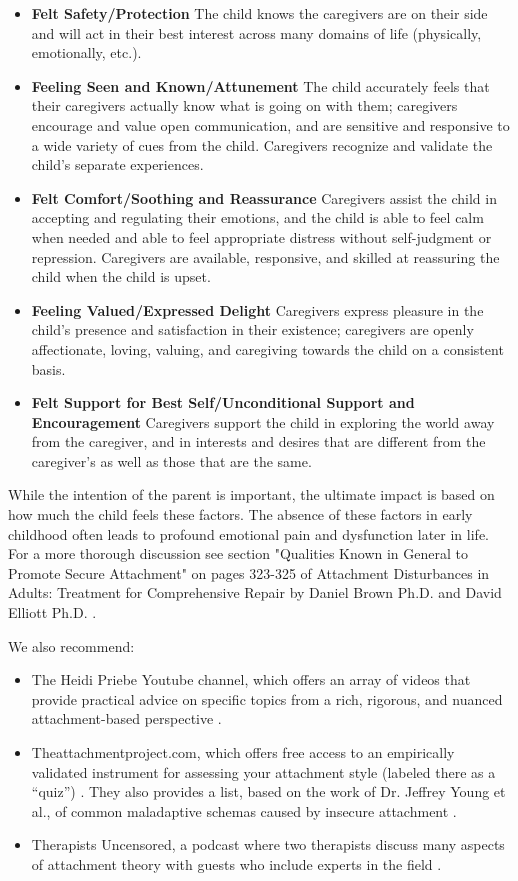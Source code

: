 \documentclass[12pt,letterpaper]{book}
\begin{document}
\begin{itemize}
    \item \textbf{Felt Safety/Protection} The child knows the caregivers are on their side and will act in their best interest across many domains of life (physically, emotionally, etc.).
    \item \textbf{Feeling Seen and Known/Attunement} The child accurately feels that their caregivers actually know what is going on with them; caregivers encourage and value open communication, and are sensitive and responsive to a wide variety of cues from the child. Caregivers recognize and validate the child's separate experiences.
    \item \textbf{Felt Comfort/Soothing and Reassurance} Caregivers assist the child in accepting and regulating their emotions, and the child is able to feel calm when needed and able to feel appropriate distress without self-judgment or repression. Caregivers are available, responsive, and skilled at reassuring the child when the child is upset.
    \item \textbf{Feeling Valued/Expressed Delight} Caregivers express pleasure in the child's presence and satisfaction in their existence; caregivers are openly affectionate, loving, valuing, and caregiving towards the child on a consistent basis.
    \item \textbf{Felt Support for Best Self/Unconditional Support and Encouragement} Caregivers support the child in exploring the world away from the caregiver, and in interests and desires that are different from the caregiver's as well as those that are the same.
\end{itemize}

While the intention of the parent is important, the ultimate impact is based on how much the child feels these factors. The absence of these factors in early childhood often leads to profound emotional pain and dysfunction later in life. For a more thorough discussion see section "Qualities Known in General to Promote Secure Attachment" on pages 323-325 of Attachment Disturbances in Adults: Treatment for Comprehensive Repair by Daniel Brown Ph.D. and David Elliott Ph.D. \cite{brownAttachmentDisturbances}.

We also recommend:
\begin{itemize}
    \item The Heidi Priebe Youtube channel, which offers an array of videos that provide practical advice on specific topics from a rich, rigorous, and nuanced attachment-based perspective \cite{priebeYoutube}.
    \item Theattachmentproject.com, which offers free access to an empirically validated instrument for assessing your attachment style (labeled there as a “quiz”) \cite{attachmentProject}. They also provides a list, based on the work of Dr. Jeffrey Young et al., of common maladaptive schemas caused by insecure attachment \cite{earlyMalSchemas}.
    \item Therapists Uncensored, a podcast where two therapists discuss many aspects of attachment theory with guests who include experts in the field \cite{therapistsUncensored}.
\end{itemize}
\end{document}
